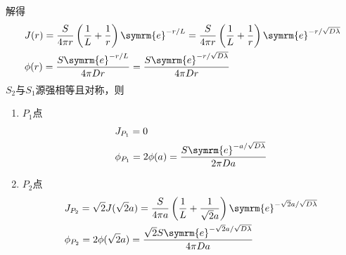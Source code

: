 \begin{exercise}
\begin{solution}
        解得
        \begin{align*}
            &J(r) = \frac{S}{4\pi r}\left(\frac{1}{L}+\frac{1}{r}\right)\symrm{e}^{-r/L} = \frac{S}{4\pi r}\left(\frac{1}{L}+\frac{1}{r}\right)\symrm{e}^{-r/\sqrt{D\lambda}} \\
            &\phi(r) = \frac{S\symrm{e}^{-r/L}}{4\pi D r} = \frac{S\symrm{e}^{-r/\sqrt{D\lambda}}}{4\pi D r}
        \end{align*}
        $S_2$与$S_1$源强相等且对称，则
        \begin{enumerate}[(1)]
            \item $P_1$点
            \begin{align*}
                &J_{P_1} = 0 \\
                &\phi_{P_1} = 2\phi(a) = \frac{S\symrm{e}^{-a/\sqrt{D\lambda}}}{2\pi D a}
            \end{align*}
            \item $P_2$点
            \begin{align*}
                &J_{P_2} = \sqrt{2}J(\sqrt{2}a) = \frac{S}{4\pi a}\left(\frac{1}{L}+\frac{1}{\sqrt{2}a}\right)\symrm{e}^{-\sqrt{2}a/\sqrt{D\lambda}} \\
                &\phi_{P_2} = 2\phi(\sqrt{2}a) = \frac{\sqrt{2}S\symrm{e}^{-\sqrt{2}a/\sqrt{D\lambda}}}{4\pi D a}
            \end{align*}
        \end{enumerate}
    \end{solution}
\end{exercise}

